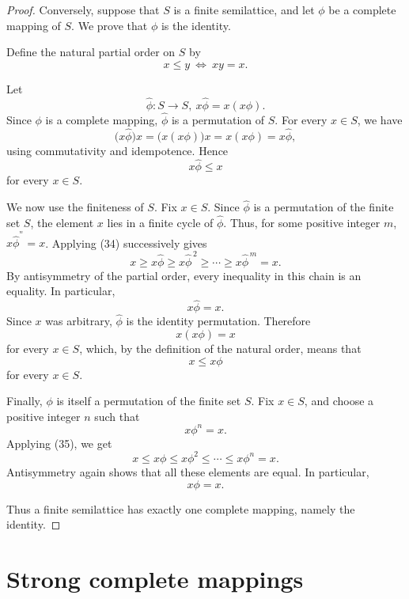 \documentclass[11pt]{article}
\theoremstyle{plain}
\theoremstyle{remark}
\theoremstyle{definition}
\theoremstyle{plain}
\begin{document}
\begin{proof}
    Conversely, suppose that $S$ is a finite semilattice, and let $\phi$
    be a complete mapping of $S$. We prove that $\phi$ is the identity.

    Define the natural partial order on $S$ by
    \[
        x\leq y
        \ \Leftrightarrow\ 
        xy=x.
    \]


    Let
    \[
        \widehat{\phi}\colon S\rightarrow S,
        \ 
        x\widehat{\phi}=x(x\phi).
    \]
    Since $\phi$ is a complete mapping, $\widehat{\phi}$ is a permutation
    of $S$. For every $x\in S$, we have
    \[
        \bigl(x\widehat{\phi}\bigr)x
        =\bigl(x(x\phi)\bigr)x
        =x(x\phi)
        =x\widehat{\phi},
    \]
    using commutativity and idempotence. Hence
    \[x\widehat{\phi}\leq x
        \tag{34}
    \]
    for every $x\in S$.

    We now use the finiteness of $S$. Fix $x\in S$. Since
    $\widehat{\phi}$ is a permutation of the finite set $S$, the element
    $x$ lies in a finite cycle of $\widehat{\phi}$. Thus, for some
    positive integer $m$,
$x{\widehat{\phi}}^{^{^{m}}}=x$.
    Applying (34) successively gives
    \[
        x
        \geq x\widehat{\phi}
        \geq x\widehat{\phi}^{\,2}
        \geq\cdots
        \geq x\widehat{\phi}^{\,m}
        =x.
    \]
    By antisymmetry of the partial order, every inequality in this chain
    is an equality. In particular,
    \[
        x\widehat{\phi}=x.
    \]
    Since $x$ was arbitrary, $\widehat{\phi}$ is the identity
    permutation. Therefore
    \[
        x(x\phi)=x
    \]
    for every $x\in S$, which, by the definition of the natural order,
    means that
    \[
        x\leq x\phi
        \tag{35}
    \]
    for every $x\in S$.

    Finally, $\phi$ is itself a permutation of the finite set $S$. Fix
    $x\in S$, and choose a positive integer $n$ such that
    \[
        x\phi^n=x.
    \]
    Applying (35), we get
    \[
        x
        \leq x\phi
        \leq x\phi^2
        \leq\cdots
        \leq x\phi^n
        =x.
    \]
    Antisymmetry again shows that all these elements are equal. In
    particular,
    \[
        x\phi=x.
    \]
    
    Thus a finite semilattice has exactly one complete mapping, namely
    the identity.
\end{proof}
\section{Strong complete mappings}
\label{Sec:strong}
\end{document}
